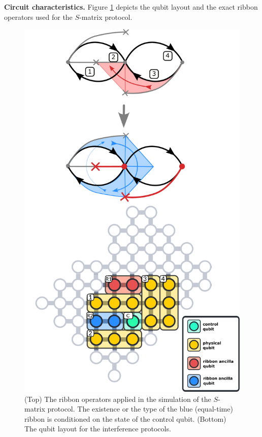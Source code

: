 \documentclass[a4paper,twocolumn,11pt]{quantumarticle}
\begin{document}
\textbf{Circuit characteristics.}
Figure \ref{fig:intef_setup} depicts the qubit layout and the exact ribbon operators used for the $S$-matrix protocol.
\begin{figure}
	\centering
	\includegraphics[width=\linewidth]{Figures/intef_setup_new.pdf}
	\caption{(Top) The ribbon operators applied in the simulation of the $S$-matrix protocol. The existence or the type of the blue (equal-time) ribbon is conditioned on the state of the control qubit. (Bottom) The qubit layout for the interference protocols.}
	\label{fig:intef_setup}
\end{figure}
\end{document}
